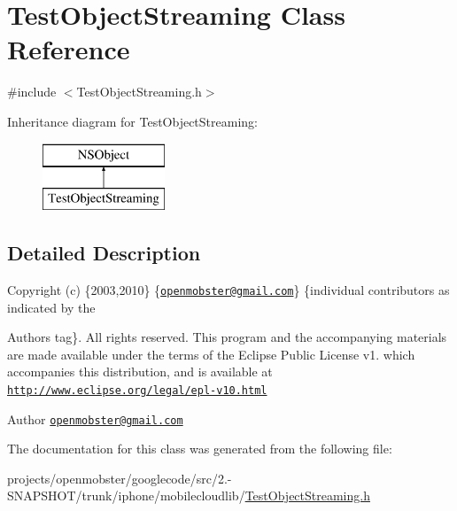 \hypertarget{interface_test_object_streaming}{
\section{\-Test\-Object\-Streaming \-Class \-Reference}
\label{interface_test_object_streaming}
}


{\ttfamily \#include $<$\-Test\-Object\-Streaming.\-h$>$}

\-Inheritance diagram for \-Test\-Object\-Streaming\-:\begin{figure}[H]
\begin{center}
\leavevmode
\includegraphics[height=2.000000cm]{interface_test_object_streaming}
\end{center}
\end{figure}


\subsection{\-Detailed \-Description}
\-Copyright (c) \{2003,2010\} \{\href{mailto:openmobster@gmail.com}{\tt openmobster@gmail.\-com}\} \{individual contributors as indicated by the \begin{DoxyAuthor}{\-Authors}
tag\}. \-All rights reserved. \-This program and the accompanying materials are made available under the terms of the \-Eclipse \-Public \-License v1. which accompanies this distribution, and is available at \href{http://www.eclipse.org/legal/epl-v10.html}{\tt http\-://www.\-eclipse.\-org/legal/epl-\/v10.\-html}
\end{DoxyAuthor}
\begin{DoxyAuthor}{\-Author}
\href{mailto:openmobster@gmail.com}{\tt openmobster@gmail.\-com} 
\end{DoxyAuthor}


\-The documentation for this class was generated from the following file\-:\begin{DoxyCompactItemize}
\item 
projects/openmobster/googlecode/src/2.-\/\-S\-N\-A\-P\-S\-H\-O\-T/trunk/iphone/mobilecloudlib/\hyperlink{_test_object_streaming_8h}{\-Test\-Object\-Streaming.\-h}\end{DoxyCompactItemize}
